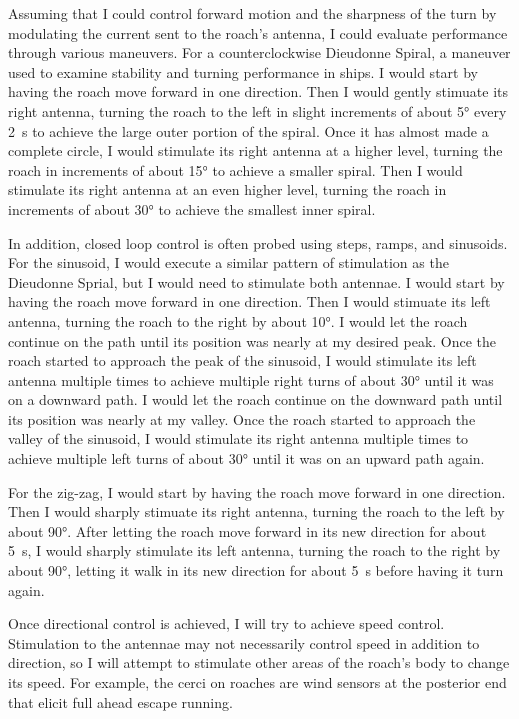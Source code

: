 Assuming that I could control forward motion and the sharpness of the turn by modulating the current sent to the roach's antenna, I could evaluate performance through various maneuvers. For a counterclockwise Dieudonne Spiral, a maneuver used to examine stability and turning performance in ships. I would start by having the roach move forward in one direction. Then I would gently stimuate its right antenna, turning the roach to the left in slight increments of about \ang{5} every \SI{2}{\second} to achieve the large outer portion of the spiral. Once it has almost made a complete circle, I would stimulate its right antenna at a higher level, turning the roach in increments of about \ang{15} to achieve a smaller spiral. Then I would stimulate its right antenna at an even higher level, turning the roach in increments of about \ang{30} to achieve the smallest inner spiral.

In addition, closed loop control is often probed using steps, ramps, and sinusoids.  For the sinusoid, I would execute a similar pattern of stimulation as the Dieudonne Sprial, but I would need to stimulate both antennae. I would start by having the roach move forward in one direction. Then I would stimuate its left antenna, turning the roach to the right by about \ang{10}. I would let the roach continue on the path until its position was nearly at my desired peak. Once the roach started to approach the peak of the sinusoid, I would stimulate its left antenna multiple times to achieve multiple right turns of about \ang{30} until it was on a downward path. I would let the roach continue on the downward path until its position was nearly at my valley. Once the roach started to approach the valley of the sinusoid, I would stimulate its right antenna multiple times to achieve multiple left turns of about \ang{30} until it was on an upward path again.

For the zig-zag, I would start by having the roach move forward in one direction. Then I would sharply stimuate its right antenna, turning the roach to the left by about \ang{90}. After letting the roach move forward in its new direction for about \SI{5}{\second}, I would sharply stimulate its left antenna, turning the roach to the right by about \ang{90}, letting it walk in its new direction for about \SI{5}{\second} before having it turn again.

Once directional control is achieved, I will try to achieve speed control. Stimulation to the antennae may not necessarily control speed in addition to direction, so I will attempt to stimulate other areas of the roach's body to change its speed.  For example, the cerci on roaches are wind sensors at the posterior end that elicit full ahead escape running.  



























